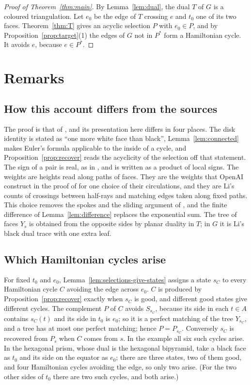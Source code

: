 \documentclass[10pt]{amsart}
\numberwithin{equation}{section}
\theoremstyle{definition}
\theoremstyle{remark}
\newcommand{\T}{T}
\begin{document}
\begin{proof}[Proof of Theorem~\ref{thm:main}]
By Lemma~\ref{lem:dual}, the dual $\T$ of $G$ is a coloured triangulation.
Let $e_0$ be the edge of $\T$ crossing $e$ and $t_0$ one of its two faces.
Theorem~\ref{thm:T} gives an acyclic selection $P$ with $e_0\in P$, and by Proposition~\ref{prop:target}(1) the edges of $G$ not in $P^*$ form a Hamiltonian cycle.
It avoids $e$, because $e\in P^*$.
\end{proof}

\section{Remarks}\label{sec:remarks}

\subsection*{How this account differs from the sources}
The proof is that of \cite{openai2026}, and its presentation here differs in four places.
The disk identity is stated as ``one more white face than black'', Lemma~\ref{lem:connected} makes Euler's formula applicable to the inside of a cycle, and Proposition~\ref{prop:recover} reads the acyclicity of the selection off that statement.
The sign of a pair is real, as in \cite{constructive2026}, and is written as a product of local signs.
The weights are heights read along paths of faces.
They are the weights that OpenAI construct in the proof of \cite[Lemma~5.3]{openai2026} for one choice of their circulations, and they are Li's counts of crossings between half-rays and matching edges \cite[Section~4]{li2026} taken along fixed paths.
This choice removes the spokes and the sliding argument of \cite[Section~5.3]{openai2026}, and the finite difference of Lemma~\ref{lem:difference} replaces the exponential sum.
The tree of faces $Y_s$ is obtained from the opposite sides by planar duality in $\T$; in $G$ it is Li's black dual trace \cite[Section~6]{li2026} with one extra leaf.

\subsection*{Which Hamiltonian cycles arise}
For fixed $t_0$ and $e_0$, Lemma~\ref{lem:selections-give-states} assigns a state $s_C$ to every Hamiltonian cycle $C$ avoiding the edge across $e_0$.
$C$ is produced by Proposition~\ref{prop:recover} exactly when $s_C$ is good, and different good states give different cycles.
The complement $P$ of $C$ avoids $S_{s_C}$, because its side in each $t\in A$ contains $s_C(t)$ and its side in $t_0$ is $e_0$; so it is a perfect matching of the tree $Y_{s_C}$, and a tree has at most one perfect matching; hence $P=P_{s_C}$.
Conversely $s_{C}$ is recovered from $P_s$ when $C$ comes from $s$.
In the example all six such cycles arise.
In the hexagonal prism, whose dual is the hexagonal bipyramid, take a black face as $t_0$ and its side on the equator as $e_0$; there are three states, two of them good, and four Hamiltonian cycles avoiding the edge, so only two arise.
(For the two other sides of $t_0$ there are two such cycles, and both arise.)
\end{document}
